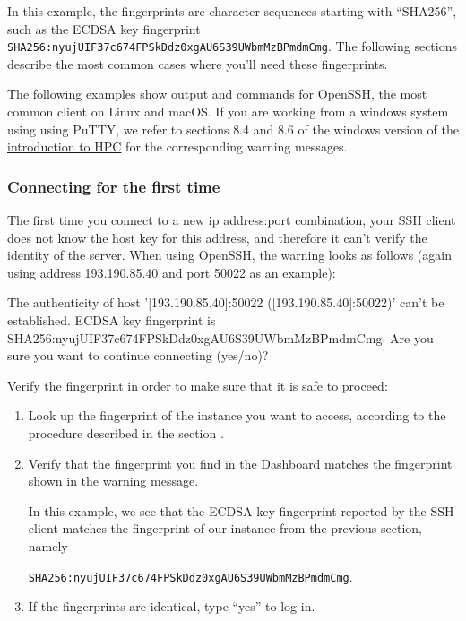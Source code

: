 In this example, the fingerprints are character sequences starting
with ``SHA256'', such as the ECDSA key fingerprint
\lstinline{SHA256:nyujUIF37c674FPSkDdz0xgAU6S39UWbmMzBPmdmCmg}.  The
following sections describe the most common cases where you'll need
these fingerprints.

 The following examples show output and commands for
OpenSSH, the most common client on Linux and macOS.  If you are
working from a windows system using using PuTTY, we refer to sections
8.4 and 8.6 of the windows version of the
\href{https://hpcugent.github.io/vsc\_user\_docs}{introduction to
  HPC} for the corresponding warning messages.

\subsubsection*{Connecting for the first time}\label{sec:conn-first-time}
The first time you connect to a new ip address:port combination, your SSH client does not know the host key for this address, and therefore it can't verify the identity of the server.  When using OpenSSH, the warning looks as follows (again using address 193.190.85.40 and port 50022 as an example):

\begin{prompt}
The authenticity of host '[193.190.85.40]:50022 ([193.190.85.40]:50022)'
can't be established.
ECDSA key fingerprint is SHA256:nyujUIF37c674FPSkDdz0xgAU6S39UWbmMzBPmdmCmg.
Are you sure you want to continue connecting (yes/no)?
\end{prompt}

Verify the fingerprint in order to make sure that it is safe to
proceed:

\begin{enumerate}
\item Look up the fingerprint of the instance you want to access,
  according to the procedure described in the section
  .
\item Verify that the fingerprint you find in the Dashboard matches
  the fingerprint shown in the warning message.

  In this example, we see that the ECDSA key fingerprint reported by
  the SSH client matches the fingerprint of our instance from the
  previous section, namely

  \lstinline{SHA256:nyujUIF37c674FPSkDdz0xgAU6S39UWbmMzBPmdmCmg}.

\item If the fingerprints are identical, type ``yes'' to log in.
\end{enumerate}

